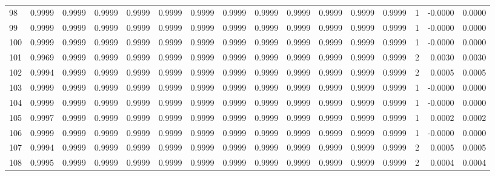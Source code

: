 \begin{tabular}{lrrrrrrrrrrrrrrr}
98  &      0.9999 &  0.9999 &  0.9999 &  0.9999 &  0.9999 &  0.9999 &  0.9999 &  0.9999 &  0.9999 &  0.9999 &   0.9999 &     0.9999 &      1 &                   -0.0000 &                     0.0000 \\
99  &      0.9999 &  0.9999 &  0.9999 &  0.9999 &  0.9999 &  0.9999 &  0.9999 &  0.9999 &  0.9999 &  0.9999 &   0.9999 &     0.9999 &      1 &                   -0.0000 &                     0.0000 \\
100 &      0.9999 &  0.9999 &  0.9999 &  0.9999 &  0.9999 &  0.9999 &  0.9999 &  0.9999 &  0.9999 &  0.9999 &   0.9999 &     0.9999 &      1 &                   -0.0000 &                     0.0000 \\
101 &      0.9969 &  0.9999 &  0.9999 &  0.9999 &  0.9999 &  0.9999 &  0.9999 &  0.9999 &  0.9999 &  0.9999 &   0.9999 &     0.9999 &      2 &                    0.0030 &                     0.0030 \\
102 &      0.9994 &  0.9999 &  0.9999 &  0.9999 &  0.9999 &  0.9999 &  0.9999 &  0.9999 &  0.9999 &  0.9999 &   0.9999 &     0.9999 &      2 &                    0.0005 &                     0.0005 \\
103 &      0.9999 &  0.9999 &  0.9999 &  0.9999 &  0.9999 &  0.9999 &  0.9999 &  0.9999 &  0.9999 &  0.9999 &   0.9999 &     0.9999 &      1 &                   -0.0000 &                     0.0000 \\
104 &      0.9999 &  0.9999 &  0.9999 &  0.9999 &  0.9999 &  0.9999 &  0.9999 &  0.9999 &  0.9999 &  0.9999 &   0.9999 &     0.9999 &      1 &                   -0.0000 &                     0.0000 \\
105 &      0.9997 &  0.9999 &  0.9999 &  0.9999 &  0.9999 &  0.9999 &  0.9999 &  0.9999 &  0.9999 &  0.9999 &   0.9999 &     0.9999 &      1 &                    0.0002 &                     0.0002 \\
106 &      0.9999 &  0.9999 &  0.9999 &  0.9999 &  0.9999 &  0.9999 &  0.9999 &  0.9999 &  0.9999 &  0.9999 &   0.9999 &     0.9999 &      1 &                   -0.0000 &                     0.0000 \\
107 &      0.9994 &  0.9999 &  0.9999 &  0.9999 &  0.9999 &  0.9999 &  0.9999 &  0.9999 &  0.9999 &  0.9999 &   0.9999 &     0.9999 &      2 &                    0.0005 &                     0.0005 \\
108 &      0.9995 &  0.9999 &  0.9999 &  0.9999 &  0.9999 &  0.9999 &  0.9999 &  0.9999 &  0.9999 &  0.9999 &   0.9999 &     0.9999 &      2 &                    0.0004 &                     0.0004 \\

\end{tabular}
